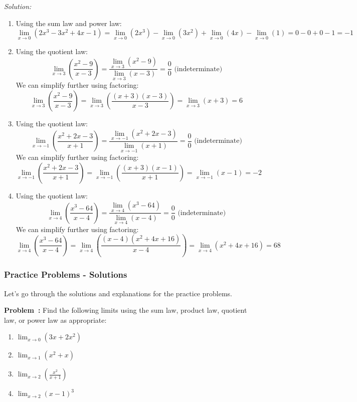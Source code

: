 \documentclass[a4paper,12pt]{book}
\newcounter{problem}
\newenvironment{problem}[1][\theproblem]
{\refstepcounter{problem}\par\medskip\noindent\textbf{Problem~#1:} \rmfamily}{\medskip}
\newenvironment{solution}[1][]
{\par\noindent\textit{Solution:} \rmfamily}{\medskip}
\begin{document}
\begin{solution}
\begin{enumerate}[label=(\alph*)]
  \item Using the sum law and power law:
  \[
  \lim_{{x \to 0}} (2x^3 - 3x^2 + 4x - 1) = \lim_{{x \to 0}} (2x^3) - \lim_{{x \to 0}} (3x^2) + \lim_{{x \to 0}} (4x) - \lim_{{x \to 0}} (1) = 0 - 0 + 0 - 1 = -1
  \]
  
  \item Using the quotient law:
  \[
  \lim_{{x \to 3}} \left(\frac{x^2 - 9}{x - 3}\right) = \frac{\lim_{{x \to 3}} (x^2 - 9)}{\lim_{{x \to 3}} (x - 3)} = \frac{0}{0} \text{ (indeterminate)}
  \]
  We can simplify further using factoring:
  \[
  \lim_{{x \to 3}} \left(\frac{x^2 - 9}{x - 3}\right) = \lim_{{x \to 3}} \left(\frac{(x + 3)(x - 3)}{x - 3}\right) = \lim_{{x \to 3}} (x + 3) = 6
  \]
  
  \item Using the quotient law:
  \[
  \lim_{{x \to -1}} \left(\frac{x^2 + 2x - 3}{x + 1}\right) = \frac{\lim_{{x \to -1}} (x^2 + 2x - 3)}{\lim_{{x \to -1}} (x + 1)} = \frac{0}{0} \text{ (indeterminate)}
  \]
  We can simplify further using factoring:
  \[
  \lim_{{x \to -1}} \left(\frac{x^2 + 2x - 3}{x + 1}\right) = \lim_{{x \to -1}} \left(\frac{(x + 3)(x - 1)}{x + 1}\right) = \lim_{{x \to -1}} (x - 1) = -2
  \]
  
  \item Using the quotient law:
  \[
  \lim_{{x \to 4}} \left(\frac{x^3 - 64}{x - 4}\right) = \frac{\lim_{{x \to 4}} (x^3 - 64)}{\lim_{{x \to 4}} (x - 4)} = \frac{0}{0} \text{ (indeterminate)}
  \]
  We can simplify further using factoring:
  \[
  \lim_{{x \to 4}} \left(\frac{x^3 - 64}{x - 4}\right) = \lim_{{x \to 4}} \left(\frac{(x - 4)(x^2 + 4x + 16)}{x - 4}\right) = \lim_{{x \to 4}} (x^2 + 4x + 16) = 68
  \]
\end{enumerate}
\end{solution}

\subsubsection*{Practice Problems - Solutions}

Let's go through the solutions and explanations for the practice problems.

\begin{problem}
Find the following limits using the sum law, product law, quotient law, or power law as appropriate:
\begin{enumerate}[label=(\alph*)]
  \item \( \lim_{{x \to 0}} (3x + 2x^2) \)
  \item \( \lim_{{x \to 1}} (x^2 + x) \)
  \item \( \lim_{{x \to 2}} \left(\frac{x^2}{x + 1}\right) \)
  \item \( \lim_{{x \to 2}} (x - 1)^3 \)
\end{enumerate}
\end{problem}
\end{document}
